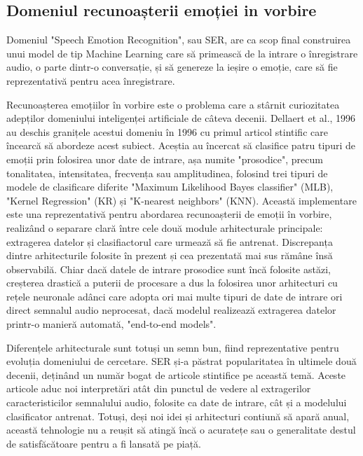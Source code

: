\documentclass[a4paper,12pt]{book}
\begin{document}
			\subsection{Domeniul recunoașterii emoției in vorbire}
				Domeniul "Speech Emotion Recognition", sau SER, are ca scop final construirea unui model de tip Machine Learning care să primească de la intrare o înregistrare audio, o parte dintr-o conversație, și să genereze la ieșire o emoție, care să fie reprezentativă pentru acea înregistrare. \par
				Recunoașterea emoțiilor în vorbire este o problema care a stârnit curiozitatea adepților domeniului inteligenței artificiale de câteva decenii. Dellaert et al., 1996 \cite{dellaert} au deschis granițele acestui domeniu în 1996 cu primul articol stintific care încearcă să abordeze acest subiect. Aceștia au încercat să clasifice patru tipuri de emoții prin folosirea unor date de intrare, așa numite "prosodice", precum tonalitatea, intensitatea, frecvența sau amplitudinea, folosind trei tipuri de modele de clasificare diferite "Maximum Likelihood Bayes classifier" (MLB), "Kernel Regression"  (KR) și "K-nearest neighbors" (KNN). Această implementare este una reprezentativă pentru abordarea recunoașterii de emoții în vorbire, realizând o separare clară între cele două module arhitecturale principale: extragerea datelor și clasifiactorul care urmează să fie antrenat. Discrepanța dintre arhitecturile folosite în prezent și cea prezentată mai sus rămâne însă observabilă. Chiar dacă datele de intrare prosodice sunt încă folosite astăzi, creșterea drastică a puterii de procesare a dus la folosirea unor arhitecturi cu rețele neuronale adânci care adopta ori mai multe tipuri de date de intrare ori direct semnalul audio neprocesat, dacă modelul realizează extragerea datelor printr-o manieră automată, "end-to-end models". \par		
				
				Diferențele arhitecturale sunt totuși un semn bun, fiind reprezentative pentru evoluția domeniului de cercetare. SER și-a păstrat popularitatea în ultimele două decenii, deținând un număr bogat de articole stintifice pe această temă. Aceste articole aduc noi interpretări atât din punctul de vedere al extragerilor caracteristicilor semnalului audio, folosite ca date de intrare, cât și a modelului clasificator antrenat. Totuși, deși noi idei și arhitecturi contiună să apară anual, această tehnologie nu a reușit să atingă încă o acuratețe sau o generalitate destul de satisfăcătoare pentru a fi lansată pe piață. \par
				
\end{document}
